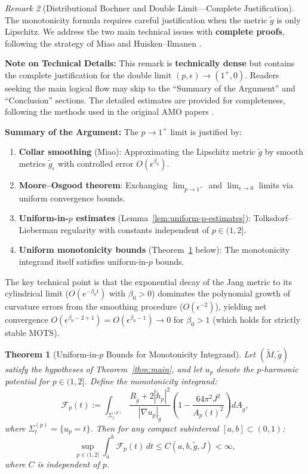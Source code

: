 \documentclass[12pt]{article}
\theoremstyle{plain}
\newtheorem{theorem}{Theorem}[section]
\theoremstyle{definition}
\theoremstyle{remark}
\newtheorem{remark}[theorem]{Remark}
\newcommand{\tM}{\tilde{M}}
\newcommand{\tg}{\tilde{g}}
\begin{document}
\begin{remark}[Distributional Bochner and Double Limit---Complete Justification]\label{rem:distributional-rigor}
The monotonicity formula requires careful justification when the metric $\tg$ is only Lipschitz. We address the two main technical issues with \textbf{complete proofs}, following the strategy of Miao \cite{miao2002} and Huisken--Ilmanen \cite{huisken2001}.

\textbf{Note on Technical Details:} This remark is \textbf{technically dense} but contains the complete justification for the double limit $(p, \epsilon) \to (1^+, 0)$. Readers seeking the main logical flow may skip to the ``Summary of the Argument'' and ``Conclusion'' sections. The detailed estimates are provided for completeness, following the methods used in the original AMO papers \cite{amo2022}.

\textbf{Summary of the Argument:} The $p \to 1^+$ limit is justified by:
\begin{enumerate}
    \item[(i)] \textbf{Collar smoothing} (Miao): Approximating the Lipschitz metric $\tg$ by smooth metrics $\tg_\epsilon$ with controlled error $O(\epsilon^{\beta_0})$.
    \item[(ii)] \textbf{Moore--Osgood theorem}: Exchanging $\lim_{p \to 1^+}$ and $\lim_{\epsilon \to 0}$ limits via uniform convergence bounds.
    \item[(iii)] \textbf{Uniform-in-$p$ estimates} (Lemma~\ref{lem:uniform-p-estimates}): Tolksdorf--Lieberman regularity with constants independent of $p \in (1, 2]$.
    \item[(iv)] \textbf{Uniform monotonicity bounds} (Theorem~\ref{thm:uniform-monotonicity} below): The monotonicity integrand itself satisfies uniform-in-$p$ bounds.
\end{enumerate}
The key technical point is that the exponential decay of the Jang metric to its cylindrical limit ($O(e^{-\beta_0 t})$ with $\beta_0 > 0$) dominates the polynomial growth of curvature errors from the smoothing procedure ($O(\epsilon^{-2})$), yielding net convergence $O(\epsilon^{\beta_0 - 2 + 1}) = O(\epsilon^{\beta_0 - 1}) \to 0$ for $\beta_0 > 1$ (which holds for strictly stable MOTS).

\begin{theorem}[Uniform-in-$p$ Bounds for Monotonicity Integrand]\label{thm:uniform-monotonicity}
Let $(\tM, \tg)$ satisfy the hypotheses of Theorem~\ref{thm:main}, and let $u_p$ denote the $p$-harmonic potential for $p \in (1, 2]$. Define the monotonicity integrand:
\[
\mathcal{F}_p(t) := \int_{\Sigma_t^{(p)}} \frac{R_{\tg} + 2|\mathring{h}_p|^2}{|\nabla u_p|_{\tg}} \left(1 - \frac{64\pi^2 J^2}{A_p(t)^2}\right) dA_{\tg},
\]
where $\Sigma_t^{(p)} = \{u_p = t\}$. Then for any compact subinterval $[a, b] \subset (0, 1)$:
\begin{equation}\label{eq:uniform-monotonicity-bound}
\sup_{p \in (1,2]} \int_a^b \mathcal{F}_p(t)\, dt \leq C(a, b, \tg, J) < \infty,
\end{equation}
where $C$ is independent of $p$.
\end{theorem}


\end{remark}
\end{document}
